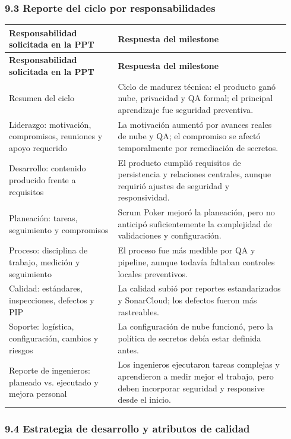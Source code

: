 \documentclass[11pt,a4paper]{article}
\begin{document}
\subsubsection{9.3 Reporte del ciclo por responsabilidades}

\begingroup
\small
\setlength{\tabcolsep}{3pt}
\begin{longtable}{P{0.36\linewidth}P{0.58\linewidth}}
\toprule
\textbf{Responsabilidad solicitada en la PPT} & \textbf{Respuesta del milestone} \\
\midrule
\endfirsthead
\toprule
\textbf{Responsabilidad solicitada en la PPT} & \textbf{Respuesta del milestone} \\
\midrule
\endhead
\bottomrule
\endlastfoot
Resumen del ciclo & Ciclo de madurez técnica: el producto ganó nube, privacidad y QA formal; el principal aprendizaje fue seguridad preventiva. \\
Liderazgo: motivación, compromisos, reuniones y apoyo requerido & La motivación aumentó por avances reales de nube y QA; el compromiso se afectó temporalmente por remediación de secretos. \\
Desarrollo: contenido producido frente a requisitos & El producto cumplió requisitos de persistencia y relaciones centrales, aunque requirió ajustes de seguridad y responsividad. \\
Planeación: tareas, seguimiento y compromisos & Scrum Poker mejoró la planeación, pero no anticipó suficientemente la complejidad de validaciones y configuración. \\
Proceso: disciplina de trabajo, medición y seguimiento & El proceso fue más medible por QA y pipeline, aunque todavía faltaban controles locales preventivos. \\
Calidad: estándares, inspecciones, defectos y PIP & La calidad subió por reportes estandarizados y SonarCloud; los defectos fueron más rastreables. \\
Soporte: logística, configuración, cambios y riesgos & La configuración de nube funcionó, pero la política de secretos debía estar definida antes. \\
Reporte de ingenieros: planeado vs. ejecutado y mejora personal & Los ingenieros ejecutaron tareas complejas y aprendieron a medir mejor el trabajo, pero deben incorporar seguridad y responsive desde el inicio. \\
\end{longtable}
\endgroup

\subsubsection{9.4 Estrategia de desarrollo y atributos de calidad}
\end{document}

